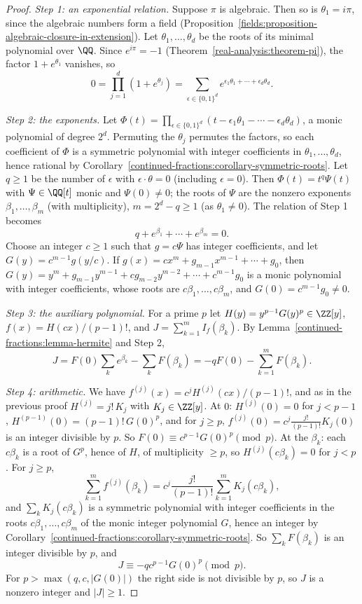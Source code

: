 \begin{proof}
\emph{Step 1: an exponential relation.} Suppose $\pi$ is algebraic. Then so is $\theta_1 = i\pi$, since the algebraic numbers form a field (Proposition~\ref{fields:proposition-algebraic-closure-in-extension}).
Let $\theta_1, \ldots, \theta_d$ be the roots of its minimal polynomial over $\QQ$. Since $e^{i\pi} = -1$ (Theorem~\ref{real-analysis:theorem-pi}), the factor $1 + e^{\theta_1}$ vanishes, so
\[
0 = \prod_{j=1}^d(1 + e^{\theta_j}) = \sum_{\epsilon \in \{0, 1\}^d}e^{\epsilon_1\theta_1 + \cdots + \epsilon_d\theta_d}.
\]

\emph{Step 2: the exponents.} Let $\Phi(t) = \prod_{\epsilon \in \{0, 1\}^d}(t - \epsilon_1\theta_1 - \cdots - \epsilon_d\theta_d)$, a monic polynomial of degree $2^d$. Permuting the $\theta_j$ permutes the
factors, so each coefficient of $\Phi$ is a symmetric polynomial with integer coefficients in $\theta_1, \ldots, \theta_d$, hence rational by Corollary~\ref{continued-fractions:corollary-symmetric-roots}.
Let $q \geq 1$ be the number of $\epsilon$ with $\epsilon \cdot \theta = 0$ (including $\epsilon = 0$). Then $\Phi(t) = t^q\Psi(t)$ with $\Psi \in \QQ[t]$ monic and $\Psi(0) \neq 0$; the roots of $\Psi$
are the nonzero exponents $\beta_1, \ldots, \beta_m$ (with multiplicity), $m = 2^d - q \geq 1$ (as $\theta_1 \neq 0$). The relation of Step 1 becomes
\[
q + e^{\beta_1} + \cdots + e^{\beta_m} = 0.
\]
Choose an integer $c \geq 1$ such that $g = c\Psi$ has integer coefficients, and let $G(y) = c^{m-1}g(y/c)$. If $g(x) = cx^m + g_{m-1}x^{m-1} + \cdots + g_0$, then
$G(y) = y^m + g_{m-1}y^{m-1} + cg_{m-2}y^{m-2} + \cdots + c^{m-1}g_0$ is a monic polynomial with integer coefficients, whose roots are $c\beta_1, \ldots, c\beta_m$, and $G(0) = c^{m-1}g_0 \neq 0$.

\emph{Step 3: the auxiliary polynomial.} For a prime $p$ let $H(y) = y^{p-1}G(y)^p \in \ZZ[y]$, $f(x) = H(cx)/(p - 1)!$, and $J = \sum_{k=1}^mI_f(\beta_k)$. By
Lemma~\ref{continued-fractions:lemma-hermite} and Step 2,
\[
J = F(0)\sum_ke^{\beta_k} - \sum_kF(\beta_k) = -qF(0) - \sum_{k=1}^mF(\beta_k).
\]

\emph{Step 4: arithmetic.} We have $f^{(j)}(x) = c^jH^{(j)}(cx)/(p - 1)!$, and as in the previous proof $H^{(j)} = j!\,K_j$ with $K_j \in \ZZ[y]$. At $0$: $H^{(j)}(0) = 0$ for $j < p - 1$,
$H^{(p-1)}(0) = (p - 1)!\,G(0)^p$, and for $j \geq p$, $f^{(j)}(0) = c^j\frac{j!}{(p - 1)!}K_j(0)$ is an integer divisible by $p$. So $F(0) \equiv c^{p-1}G(0)^p \pmod p$. At the $\beta_k$: each
$c\beta_k$ is a root of $G^p$, hence of $H$, of multiplicity $\geq p$, so $H^{(j)}(c\beta_k) = 0$ for $j < p$. For $j \geq p$,
\[
\sum_{k=1}^mf^{(j)}(\beta_k) = c^j\frac{j!}{(p - 1)!}\sum_{k=1}^mK_j(c\beta_k),
\]
and $\sum_kK_j(c\beta_k)$ is a symmetric polynomial with integer coefficients in the roots $c\beta_1, \ldots, c\beta_m$ of the monic integer polynomial $G$, hence an integer by
Corollary~\ref{continued-fractions:corollary-symmetric-roots}. So $\sum_kF(\beta_k)$ is an integer divisible by $p$, and
\[
J \equiv -qc^{p-1}G(0)^p \pmod p.
\]
For $p > \max(q, c, |G(0)|)$ the right side is not divisible by $p$, so $J$ is a nonzero integer and $|J| \geq 1$.


\end{proof}
